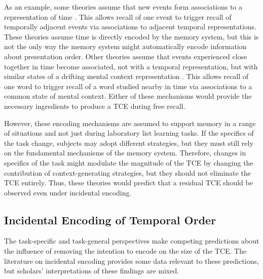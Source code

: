 \documentclass[man,natbib,floatsintext]{apa6} %
\begin{document}
As an example, some theories assume that new events form associations to a representation of time \citep{HowaEtal14a,BrowEtal07}. This allows recall of one event to trigger recall of temporally adjacent events via associations to adjacent temporal representations. These theories assume time is directly encoded by the memory system, but this is not the only way the memory system might automatically encode information about presentation order. Other theories assume that events experienced close together in time become associated, not with a temporal representation, but with similar states of a drifting mental context representation \citep{PolyEtal09,LohnEtal14,McGe32}. This allows recall of one word to trigger recall of a word studied nearby in time via associations to a common state of mental context. Either of these mechanisms would provide the necessary ingredients to produce a TCE during free recall. 

However, these encoding mechanisms are assumed to support memory in a range of situations and not just during laboratory list learning tasks. If the specifics of the task change, subjects may adopt different strategies, but they must still rely on the fundamental mechanisms of the memory system. Therefore, changes in specifics of the task might modulate the magnitude of the TCE by changing the contribution of context-generating strategies, but they should not eliminate the TCE entirely. Thus, these theories would predict that a residual TCE should be observed even under incidental encoding.

\subsection{Incidental Encoding of Temporal Order}
The task-specific and task-general perspectives make competing predictions about the influence of removing the intention to encode on the size of the TCE. The literature on incidental encoding provides some data relevant to these predictions, but scholars' interpretations of these findings are mixed. 
\end{document}
